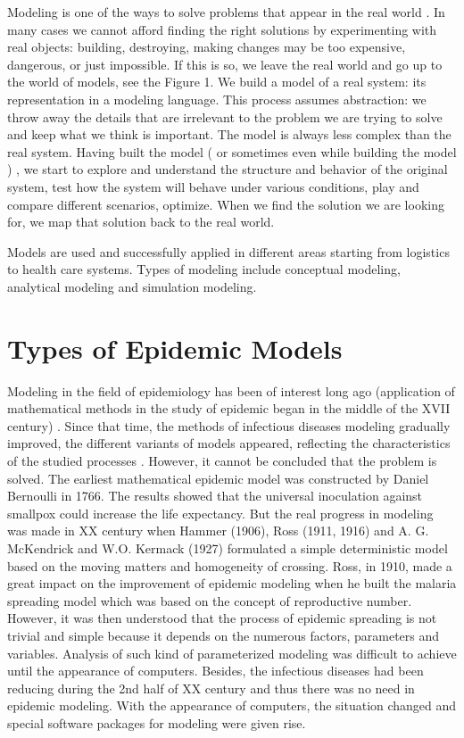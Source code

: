 Modeling is one of the ways to solve problems that appear in the real world \cite{per9}. In many cases we cannot afford finding the right solutions by experimenting   with real objects:  building, destroying, making changes may be too expensive, dangerous, or just impossible. If this is so, we leave the real world and go up to the world of models, see the Figure 1. We build a model of a real system: its representation in a modeling language. This process assumes abstraction: we throw away the details that are irrelevant to the problem we are trying to solve and keep what we think is important. The model is always less complex than the real system. Having built the model ( or sometimes  even while building the model ) , we  start to explore and understand the structure and behavior of the original system, test how the system will behave under various conditions, play  and compare different scenarios, optimize.  When we find the solution we are looking for, we map that solution back to the real world.

Models are used and successfully applied in different areas starting from logistics to health care systems. Types of modeling include conceptual modeling, analytical modeling and simulation modeling.

\section{Types of Epidemic Models}

Modeling in the field of epidemiology has been of interest long ago (application of mathematical methods in the study of epidemic began in the middle of the XVII century) \cite{per12}. Since that time, the methods of infectious diseases modeling gradually improved, the different variants of models appeared, reflecting the characteristics of the studied processes \cite{per12}. However, it cannot be concluded that the problem is solved. The earliest mathematical epidemic model was constructed by Daniel Bernoulli in 1766. The results showed that the universal inoculation against smallpox could increase the life expectancy. But the real progress in modeling was made in XX century when Hammer (1906), Ross (1911, 1916) and A. G. McKendrick and W.O. Kermack (1927) formulated a simple deterministic model based on the moving matters and homogeneity of crossing. Ross, in 1910, made a great impact on the improvement of epidemic modeling when he built the malaria spreading model which was based on the concept of reproductive number. However, it was then understood that the process of epidemic spreading is not trivial and simple because it depends on the numerous factors, parameters and variables. Analysis of such kind of parameterized modeling was difficult to achieve until the appearance of computers. Besides, the infectious diseases had been reducing during the 2nd half of XX century and thus there was no need in epidemic modeling. With the appearance of computers, the situation changed and special software packages for modeling were given rise.

